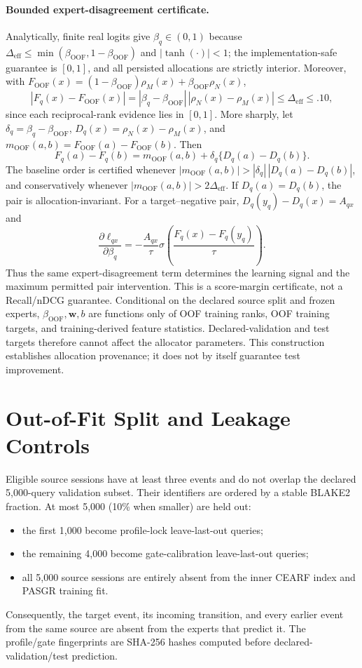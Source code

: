 \documentclass[runningheads]{llncs}
\newcommand{\rr}{\rho}
\begin{document}
\paragraph{Bounded expert-disagreement certificate.}
Analytically, finite real logits give $\beta_q\in(0,1)$ because
$\Delta_{\mathrm{eff}}\leq
\min(\beta_{\mathrm{OOF}},1-\beta_{\mathrm{OOF}})$ and
$|\tanh(\cdot)|<1$; the implementation-safe guarantee is $[0,1]$, and all
persisted allocations are strictly interior. Moreover, with
$F_{\mathrm{OOF}}(x)=(1-\beta_{\mathrm{OOF}})\rr_M(x)+
\beta_{\mathrm{OOF}}\rr_N(x)$,
\[
|F_q(x)-F_{\mathrm{OOF}}(x)|
=|\beta_q-\beta_{\mathrm{OOF}}|\,|\rr_N(x)-\rr_M(x)|
\leq\Delta_{\mathrm{eff}}\leq.10,
\]
since each reciprocal-rank evidence lies in $[0,1]$. More sharply, let
$\delta_q=\beta_q-\beta_{\mathrm{OOF}}$,
$D_q(x)=\rr_N(x)-\rr_M(x)$, and
$m_{\mathrm{OOF}}(a,b)=F_{\mathrm{OOF}}(a)-F_{\mathrm{OOF}}(b)$. Then
\[
F_q(a)-F_q(b)=m_{\mathrm{OOF}}(a,b)+
\delta_q\{D_q(a)-D_q(b)\}.
\]
The baseline order is certified whenever
$|m_{\mathrm{OOF}}(a,b)|>
|\delta_q|\,|D_q(a)-D_q(b)|$, and conservatively whenever
$|m_{\mathrm{OOF}}(a,b)|>2\Delta_{\mathrm{eff}}$. If
$D_q(a)=D_q(b)$, the pair is allocation-invariant. For a target--negative
pair, $D_q(y_q)-D_q(x)=A_{qx}$ and
\[
\frac{\partial\ell_{qx}}{\partial\beta_q}
=-\frac{A_{qx}}{\tau}
\sigma\!\left(\frac{F_q(x)-F_q(y_q)}{\tau}\right).
\]
Thus the same expert-disagreement term determines the learning signal and the
maximum permitted pair intervention. This is a score-margin certificate, not
a Recall/nDCG guarantee.
Conditional on the
declared source split and frozen
experts, $\beta_{\mathrm{OOF}},\mathbf w,b$ are functions only of OOF
training ranks, OOF training targets, and training-derived feature
statistics. Declared-validation and test targets therefore cannot affect the
allocator parameters. This construction establishes allocation provenance;
it does not by itself guarantee test improvement.

\section{Out-of-Fit Split and Leakage Controls}
Eligible source sessions have at least three events and do not overlap the
declared 5,000-query validation subset. Their identifiers are ordered by a
stable BLAKE2 fraction. At most 5,000 (10\% when smaller) are held out:
\begin{itemize}
\item the first 1,000 become profile-lock leave-last-out queries;
\item the remaining 4,000 become gate-calibration leave-last-out queries;
\item all 5,000 source sessions are entirely absent from the inner CEARF
index and PASGR training fit.
\end{itemize}
Consequently, the target event, its incoming transition, and every earlier
event from the same source are absent from the experts that predict it. The
profile/gate fingerprints are SHA-256 hashes computed before
declared-validation/test prediction.
\end{document}
